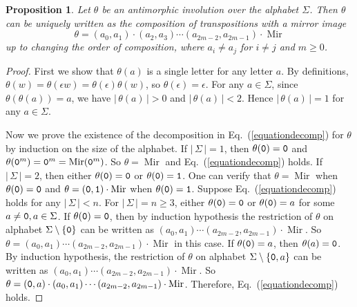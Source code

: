 \documentclass[12pt]{article}
\def\abs#1{{|\,#1\,|}}
\def\mirror{{\operatorname{Mir}}}
\def\mtt#1{{\tt #1}}
\newtheorem{proposition}[theorem]{Proposition}
\begin{document}
\begin{proposition}\label{prop:decomposition}
Let $\theta$ be an antimorphic involution over the alphabet
$\Sigma$. Then $\theta$ can be uniquely written as the composition
of transpositions with a mirror image
\begin{equation}\label{equationdecomp}
  \theta=(a_0,a_1)\cdot(a_2,a_3)\cdots(a_{2m-2},a_{2m-1})\cdot\mirror
\end{equation}
up to changing the order of composition, where $a_i\neq a_j$ for
$i\neq j$ and $m\geq 0$.
\end{proposition}
\begin{proof}
First we show that $\theta(a)$ is a single letter for any letter
$a$. By definitions, $\theta(w)=\theta(\epsilon
w)=\theta(\epsilon)\theta(w)$, so $\theta(\epsilon)=\epsilon$. For
any $a\in\Sigma$, since $\theta(\theta(a))=a$, we have
$\abs{\theta(a)}>0$ and $\abs{\theta(a)}<2$. Hence
$\abs{\theta(a)}=1$ for any $a\in\Sigma$.

Now we prove the existence of the decomposition in
Eq.~(\ref{equationdecomp}) for $\theta$ by induction on the size of
the alphabet. If $\abs{\Sigma}=1$, then $\theta(\mtt0)=\mtt0$ and
$\theta(\mtt0^m)=\mtt0^m=\mirror(\mtt0^m)$. So $\theta=\mirror$ and
Eq.~(\ref{equationdecomp}) holds. If $\abs{\Sigma}=2$, then either
$\theta(\mtt0)=\mtt0$ or $\theta(\mtt0)=\mtt1$. One can verify that
$\theta=\mirror$ when $\theta(\mtt0)=\mtt0$ and
$\theta=(\mtt0,\mtt1)\cdot\mirror$ when $\theta(\mtt0)=\mtt1$.
Suppose Eq.~(\ref{equationdecomp}) holds for any $\abs{\Sigma}<n$.
For $\abs{\Sigma}=n\geq 3$, either $\theta(\mtt0)=\mtt0$ or
$\theta(\mtt0)=a$ for some $a\neq\mtt0,a\in\Sigma$. If
$\theta(\mtt0)=\mtt0$, then by induction hypothesis the restriction
of $\theta$ on alphabet $\Sigma\setminus\{\mtt0\}$ can be written as
$(a_0,a_1)\cdots(a_{2m-2},a_{2m-1})\cdot\mirror$. So
$\theta=(a_0,a_1)\cdots(a_{2m-2},a_{2m-1})\cdot\mirror$ in this
case. If $\theta(\mtt0)=a$, then $\theta(a)=\mtt0$. By induction
hypothesis, the restriction of $\theta$ on alphabet
$\Sigma\setminus\{\mtt0,a\}$ can be written as
$(a_0,a_1)\cdots(a_{2m-2},a_{2m-1})\cdot\mirror$. So
$\theta=(\mtt0,a)\cdot(a_0,a_1)\cdots(a_{2m-2},a_{2m-1})\cdot\mirror$.
Therefore, Eq.~(\ref{equationdecomp}) holds.


\end{proof}
\end{document}
